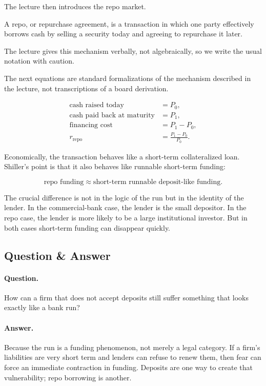The lecture then introduces the repo market.

\begin{definition}
A repo, or repurchase agreement, is a transaction in which one party effectively borrows cash by selling a security today and agreeing to repurchase it later.
\end{definition}

The lecture gives this mechanism verbally, not algebraically, so we write the usual notation with caution.

\begin{remark}
The next equations are standard formalizations of the mechanism described in the lecture, not transcriptions of a board derivation.
\end{remark}

\begin{align}
\text{cash raised today} &= P_0, \\
\text{cash paid back at maturity} &= P_1, \\
\text{financing cost} &= P_1 - P_0, \\
r_{\text{repo}} &= \frac{P_1-P_0}{P_0}.
\end{align}

Economically, the transaction behaves like a short-term collateralized loan. Shiller's point is that it also behaves like runnable short-term funding:

\begin{equation}
\text{repo funding} \approx \text{short-term runnable deposit-like funding}.
\end{equation}

The crucial difference is not in the logic of the run but in the identity of the lender. In the commercial-bank case, the lender is the small depositor. In the repo case, the lender is more likely to be a large institutional investor. But in both cases short-term funding can disappear quickly.

\subsection{Question \& Answer}

\paragraph{Question.} How can a firm that does not accept deposits still suffer something that looks exactly like a bank run?

\paragraph{Answer.} Because the run is a funding phenomenon, not merely a legal category. If a firm's liabilities are very short term and lenders can refuse to renew them, then fear can force an immediate contraction in funding. Deposits are one way to create that vulnerability; repo borrowing is another.

